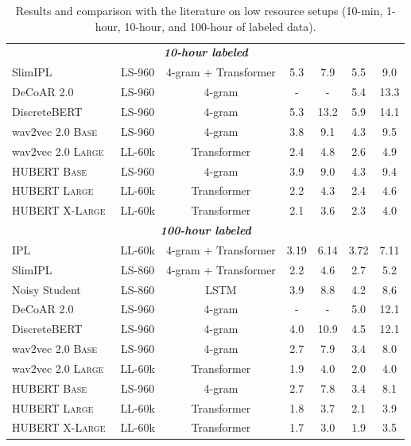 \begin{table}[t]
\begin{tabular}{lcccccc}
        \midrule\midrule
        \multicolumn{7}{c}{\textit{\textbf{10-hour labeled}}} \\
        SlimIPL~\cite{likhomanenko2020slimipl} & LS-960 & 4-gram + Transformer & 5.3 & 7.9 & 5.5 & 9.0 \\
        DeCoAR 2.0~\cite{ling2020decoar} & LS-960 & 4-gram & - & - & 5.4 & 13.3 \\
        DiscreteBERT~\cite{baevski2019effectiveness} & LS-960 & 4-gram & 5.3 & 13.2 & 5.9 & 14.1 \\
        wav2vec 2.0 \textsc{Base}~\cite{baevski2020wav2vec}   & LS-960 & 4-gram & 3.8 & 9.1 & 4.3 & 9.5 \\
        wav2vec 2.0 \textsc{Large}~\cite{baevski2020wav2vec}  & LL-60k & Transformer & 2.4 & 4.8 & 2.6 & 4.9 \\
        \midrule
        HUBERT \textsc{Base}    & LS-960 & 4-gram & 3.9 & 9.0 & 4.3 & 9.4 \\
        HUBERT \textsc{Large}   & LL-60k & Transformer & 2.2 & 4.3 & 2.4 & 4.6 \\
        HUBERT \textsc{X-Large} & LL-60k & Transformer & 2.1 & 3.6 & 2.3 & 4.0 \\
        
        \midrule\midrule
        \multicolumn{7}{c}{\textit{\textbf{100-hour labeled}}} \\
        IPL~\cite{xu2020iterative} & LL-60k & 4-gram + Transformer & 3.19 & 6.14 & 3.72 & 7.11 \\
        SlimIPL~\cite{likhomanenko2020slimipl} & LS-860 & 4-gram + Transformer & 2.2 & 4.6 & 2.7 & 5.2 \\
        Noisy Student\cite{park2020improved} & LS-860 & LSTM & 3.9 & 8.8 & 4.2 & 8.6 \\
        DeCoAR 2.0~\cite{ling2020decoar} & LS-960 & 4-gram & - & - & 5.0 & 12.1 \\
        DiscreteBERT~\cite{baevski2019effectiveness} & LS-960 & 4-gram & 4.0 & 10.9 & 4.5 & 12.1 \\
        wav2vec 2.0 \textsc{Base}~\cite{baevski2020wav2vec}   & LS-960 & 4-gram & 2.7 & 7.9 & 3.4 & 8.0 \\
        wav2vec 2.0 \textsc{Large}~\cite{baevski2020wav2vec}  & LL-60k & Transformer & 1.9 & 4.0 & 2.0 & 4.0 \\
        
        \midrule
        HUBERT \textsc{Base}    & LS-960 & 4-gram & 2.7 & 7.8 & 3.4 & 8.1  \\
        HUBERT \textsc{Large}   & LL-60k & Transformer & 1.8 & 3.7 & 2.1 & 3.9 \\
        HUBERT \textsc{X-Large} & LL-60k & Transformer & 1.7 & 3.0 & 1.9 & 3.5 \\
        
        \bottomrule
    \end{tabular}
    \caption{Results and comparison with the literature on low resource setups (10-min, 1-hour, 10-hour, and 100-hour of labeled data).}
    \label{tab:main_lo}
\end{table}